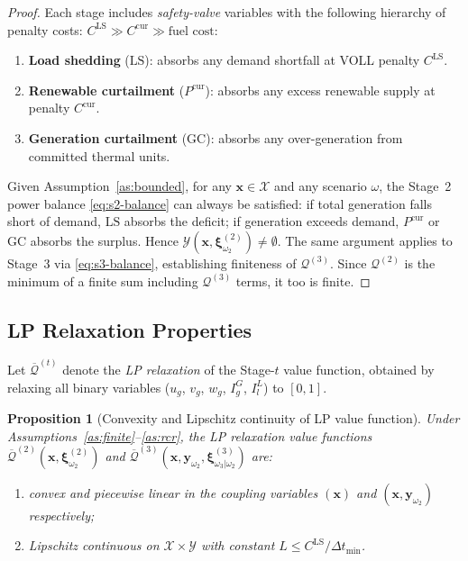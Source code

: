 \documentclass[11pt]{article}
\newcommand{\LS}{\mathrm{LS}}
\newcommand{\GC}{\mathrm{GC}}
\newtheorem{proposition}{Proposition}
\begin{document}
\begin{proof}
Each stage includes \emph{safety-valve} variables with the following
hierarchy of penalty costs:
$C^{\mathrm{LS}} \gg C^{\mathrm{cur}} \gg \text{fuel cost}$:
\begin{enumerate}[nosep]
  \item \textbf{Load shedding} ($\LS$): absorbs any demand shortfall
        at VOLL penalty $C^{\mathrm{LS}}$.
  \item \textbf{Renewable curtailment} ($P^{\mathrm{cur}}$): absorbs
        any excess renewable supply at penalty $C^{\mathrm{cur}}$.
  \item \textbf{Generation curtailment} ($\GC$): absorbs any
        over-generation from committed thermal units.
\end{enumerate}
Given Assumption~\ref{as:bounded}, for any $\mathbf{x} \in
\mathcal{X}$ and any scenario $\omega$, the Stage~2 power balance
\eqref{eq:s2-balance} can always be satisfied: if total generation
falls short of demand, $\LS$ absorbs the deficit; if generation
exceeds demand, $P^{\mathrm{cur}}$ or $\GC$ absorbs the surplus.
Hence $\mathcal{Y}(\mathbf{x}, \boldsymbol{\xi}^{(2)}_{\omega_2})
\neq \emptyset$. The same argument applies to Stage~3 via
\eqref{eq:s3-balance}, establishing finiteness of
$\mathcal{Q}^{(3)}$. Since $\mathcal{Q}^{(2)}$ is the minimum of a
finite sum including $\mathcal{Q}^{(3)}$ terms, it too is finite.
\end{proof}

\subsection{LP Relaxation Properties}\label{sec:lp-props}

Let $\overline{\mathcal{Q}}^{(t)}$ denote the \emph{LP relaxation}
of the Stage-$t$ value function, obtained by relaxing all binary
variables ($u_g$, $v_g$, $w_g$, $I^G_g$, $I^L_l$) to $[0,1]$.

\begin{proposition}[Convexity and Lipschitz continuity of LP value
  function]\label{prop:convex}
Under Assumptions~\ref{as:finite}--\ref{as:rcr}, the LP relaxation
value functions $\overline{\mathcal{Q}}^{(2)}(\mathbf{x},
\boldsymbol{\xi}^{(2)}_{\omega_2})$ and
$\overline{\mathcal{Q}}^{(3)}(\mathbf{x}, \mathbf{y}_{\omega_2},
\boldsymbol{\xi}^{(3)}_{\omega_3|\omega_2})$ are:
\begin{enumerate}[nosep]
  \item convex and piecewise linear in the coupling variables
        $(\mathbf{x})$ and $(\mathbf{x}, \mathbf{y}_{\omega_2})$
        respectively;
  \item Lipschitz continuous on $\mathcal{X}
        \times \mathcal{Y}$ with constant
        $L \leq C^{\mathrm{LS}} / \Delta t_{\min}$.
\end{enumerate}
\end{proposition}
\end{document}
